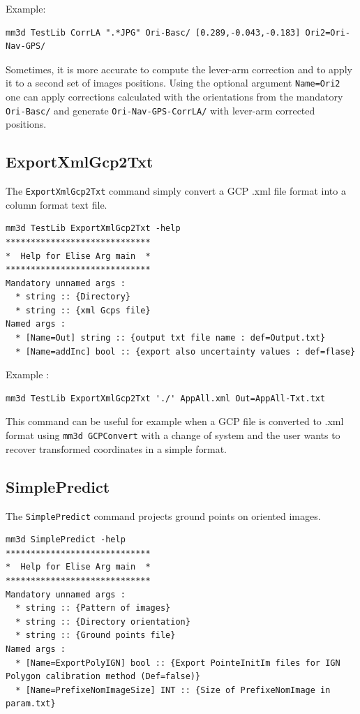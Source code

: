 Example:
\begin{verbatim}
mm3d TestLib CorrLA ".*JPG" Ori-Basc/ [0.289,-0.043,-0.183] Ori2=Ori-Nav-GPS/
\end{verbatim}

Sometimes, it is more accurate to compute the lever-arm correction and to apply it to a second set of images positions.
Using the optional argument {\tt Name=Ori2} one can apply corrections calculated with the orientations from the mandatory {\tt Ori-Basc/} and generate {\tt Ori-Nav-GPS-CorrLA/} with
lever-arm corrected positions. 

\subsection{ExportXmlGcp2Txt}
The {\tt ExportXmlGcp2Txt} command simply convert a GCP .xml file format into a column format text file.

\begin{verbatim}
mm3d TestLib ExportXmlGcp2Txt -help
*****************************
*  Help for Elise Arg main  *
*****************************
Mandatory unnamed args : 
  * string :: {Directory}
  * string :: {xml Gcps file}
Named args : 
  * [Name=Out] string :: {output txt file name : def=Output.txt}
  * [Name=addInc] bool :: {export also uncertainty values : def=flase}
\end{verbatim}

Example :
\begin{verbatim}
mm3d TestLib ExportXmlGcp2Txt './' AppAll.xml Out=AppAll-Txt.txt
\end{verbatim}

This command can be useful for example when a GCP file is converted to .xml format using {\tt mm3d GCPConvert} with a change of system and the user wants to recover transformed coordinates in a simple format.


\subsection{SimplePredict}
The {\tt SimplePredict} command projects ground points on oriented images.

\begin{verbatim}
mm3d SimplePredict -help
*****************************
*  Help for Elise Arg main  *
*****************************
Mandatory unnamed args : 
  * string :: {Pattern of images}
  * string :: {Directory orientation}
  * string :: {Ground points file}
Named args : 
  * [Name=ExportPolyIGN] bool :: {Export PointeInitIm files for IGN Polygon calibration method (Def=false)}
  * [Name=PrefixeNomImageSize] INT :: {Size of PrefixeNomImage in param.txt}
\end{verbatim}


